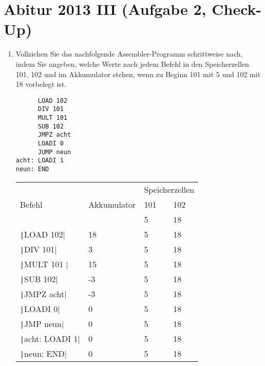 \documentclass{lehramt-informatik-aufgabe}
\def\liAssemblerCode#1{\texttt|#1|}
\begin{document}

\section{Abitur 2013 III (Aufgabe 2, Check-Up)
}

\begin{enumerate}


\item Vollziehen Sie das nachfolgende Assembler-Programm schrittweise
nach, indem Sie angeben, welche Werte nach jedem Befehl in den
Speicherzellen 101, 102 und im Akkumulator stehen, wenn zu Beginn 101
mit 5 und 102 mit 18 vorbelegt ist.

\begin{verbatim}
      LOAD 102
      DIV 101
      MULT 101
      SUB 102
      JMPZ acht
      LOADI 0
      JUMP neun
acht: LOADI 1
neun: END
\end{verbatim}

\begin{tabular}{|l|l|l|l|}
              &                                              & \multicolumn{2}{l}{Speicherzellen}                                                                  \\
Befehl        & Akkumulator                                  & 101                                               & 102                                             \\\hline
              &                                              & 5                                                 & 18                                              \\
\liAssemblerCode{LOAD 102}      & 18 & 5 & 18 \\
\liAssemblerCode{DIV 101}       & 3  & 5 & 18 \\
\liAssemblerCode{MULT 101 }     & 15 & 5 & 18 \\
\liAssemblerCode{SUB 102}       & -3 & 5 & 18 \\
\liAssemblerCode{JMPZ acht}     & -3 & 5 & 18 \\
\liAssemblerCode{LOADI 0}       & 0  & 5 & 18 \\
\liAssemblerCode{JMP neun}      & 0  & 5 & 18 \\
\liAssemblerCode{acht: LOADI 1} & 0  & 5 & 18 \\
\liAssemblerCode{neun: END}     & 0  & 5 & 18 \\
\end{tabular}


\end{enumerate}
\end{document}
